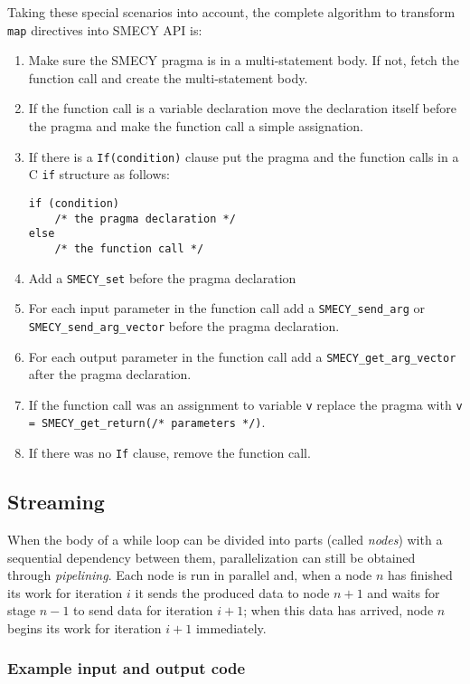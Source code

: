 \documentclass [A4]{article}
\begin{document}
	Taking these special scenarios into account, the complete algorithm to transform \verb+map+ directives into SMECY API is:
	\begin{enumerate}
		\item Make sure the SMECY pragma is in a multi-statement body. If not, fetch the function call and create the multi-statement body.
		\item If the function call is a variable declaration move the declaration itself before the pragma and make the function call a simple assignation.
		\item If there is a \verb+If(condition)+ clause put the pragma and the function calls in a C \verb+if+ structure as follows:
		\begin{lstlisting}[frame=none, numbers=none]
if (condition)
	/* the pragma declaration */
else
	/* the function call */
		\end{lstlisting}
		\item Add a \verb+SMECY_set+ before the pragma declaration
		\item For each input parameter in the function call add a \verb+SMECY_send_arg+ or \verb+SMECY_send_arg_vector+ before the pragma declaration.
		\item For each output parameter in the function call add a \verb+SMECY_get_arg_vector+ after the pragma declaration.
		\item If the function call was an assignment to variable \verb+v+ replace the pragma with \verb+v = SMECY_get_return(/* parameters */)+.
		\item If there was no \verb+If+ clause, remove the function call.
	\end{enumerate}

	\subsection{Streaming}
	When the body of a while loop can be divided into parts (called \emph{nodes}) with a sequential dependency between them, parallelization can still be obtained through \emph{pipelining}. Each node is run in parallel and, when a node $n$ has finished its work for iteration $i$ it sends the produced data to node $n+1$ and waits for stage $n-1$ to send data for iteration $i+1$; when this data has arrived, node $n$ begins its work for iteration $i+1$ immediately.
	
	\subsubsection{Example input and output code}
	
\end{document}
